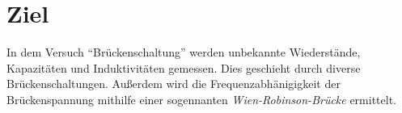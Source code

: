 \section{Ziel}
\label{sec:Ziel}

In dem Versuch \enquote{Brückenschaltung} werden unbekannte Wiederstände, Kapazitäten und Induktivitäten
gemessen. Dies geschieht durch diverse Brückenschaltungen. Außerdem wird die Frequenzabhänigigkeit der Brückenspannung
mithilfe einer sogennanten \textit{Wien-Robinson-Brücke} ermittelt.